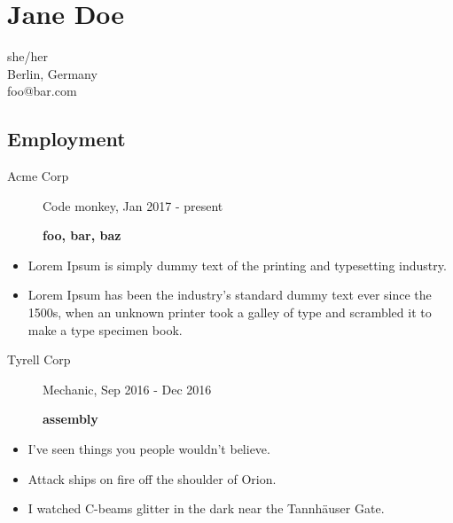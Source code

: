 \documentclass[10pt]{article}
\begin{document}
  
    \section{Jane Doe}
    \vspace{-1em}
    she/her\\
    Berlin, Germany\\
    foo@bar.com



\begin{paracol}{2}
\begin{leftcolumn}
\section{Employment}

\begin{description}
    \item [Acme Corp] Code monkey, Jan 2017 - present
    \item [] \textbf{\footnotesize{
     foo,  bar,  baz 
    }}
\end{description}
\begin{itemize}
    
    \item Lorem Ipsum is simply dummy text of the printing and typesetting industry.
    
    \item Lorem Ipsum has been the industry's standard dummy text ever since the 1500s, when an unknown printer took a galley of type and scrambled it to make a type specimen book.
    
\end{itemize}

\begin{description}
    \item [Tyrell Corp] Mechanic, Sep 2016 - Dec 2016
    \item [] \textbf{\footnotesize{
     assembly 
    }}
\end{description}
\begin{itemize}
    
    \item I've seen things you people wouldn't believe.
    
    \item Attack ships on fire off the shoulder of Orion.
    
    \item I watched C-beams glitter in the dark near the Tannhäuser Gate.
    

\end{itemize}
\end{leftcolumn}
\end{paracol}
\end{document}
